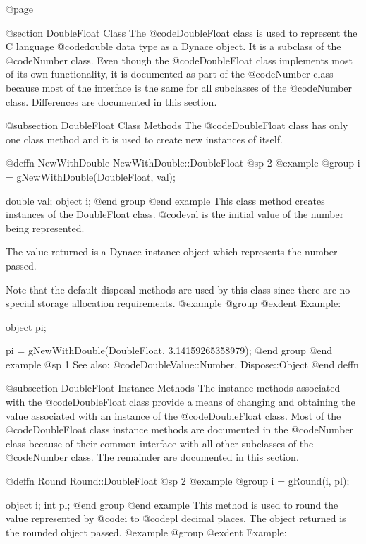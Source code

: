 @page

@section DoubleFloat Class
The @code{DoubleFloat} class is used to represent the C language
@code{double} data type as a Dynace object.  It is a subclass of the
@code{Number} class.  Even though the @code{DoubleFloat} class
implements most of its own functionality, it is documented as part of
the @code{Number} class because most of the interface is the same for
all subclasses of the @code{Number} class.  Differences are documented
in this section.






@subsection DoubleFloat Class Methods
The @code{DoubleFloat} class has only one class method and it is used to
create new instances of itself.



@deffn {NewWithDouble} NewWithDouble::DoubleFloat
@sp 2
@example
@group
i = gNewWithDouble(DoubleFloat, val);

double  val;
object  i;
@end group
@end example
This class method creates instances of the DoubleFloat class.  @code{val}
is the initial value of the number being represented.  

The value returned is a Dynace instance object which represents the number
passed.

Note that the default disposal methods are used by this class since
there are no special storage allocation requirements.
@example
@group
@exdent Example:

object  pi;

pi = gNewWithDouble(DoubleFloat, 3.14159265358979);
@end group
@end example
@sp 1
See also:  @code{DoubleValue::Number, Dispose::Object}
@end deffn





@subsection DoubleFloat Instance Methods
The instance methods associated with the @code{DoubleFloat} class provide
a means of changing and obtaining the value associated with an instance
of the @code{DoubleFloat} class.  Most of the @code{DoubleFloat} class
instance methods are documented in the @code{Number} class because of
their common interface with all other subclasses of the @code{Number}
class.  The remainder are documented in this section.




 
@deffn {Round} Round::DoubleFloat
@sp 2
@example
@group
i = gRound(i, pl);

object  i;
int     pl;
@end group
@end example
This method is used to round the value represented by @code{i} to
@code{pl} decimal places.  The object returned is the rounded
object passed.
@example
@group
@exdent Example:

